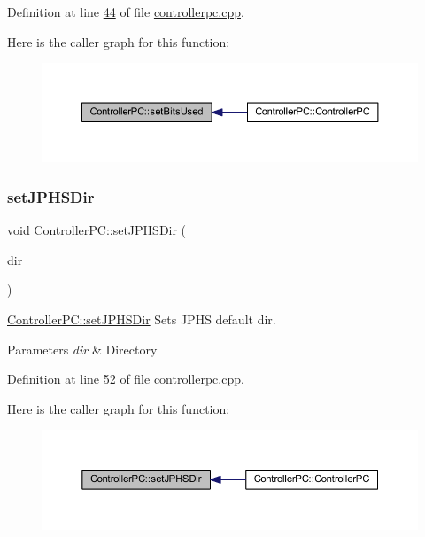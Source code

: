 Definition at line \mbox{\hyperlink{controllerpc_8cpp_source_l00044}{44}} of file \mbox{\hyperlink{controllerpc_8cpp_source}{controllerpc.\+cpp}}.

Here is the caller graph for this function\+:
\nopagebreak
\begin{figure}[H]
\begin{center}
\leavevmode
\includegraphics[width=350pt]{class_controller_p_c_afd8d33ed84e463c5e0ce6715067003f3_icgraph}
\end{center}
\end{figure}
\mbox{\label{class_controller_p_c_ac00d29685a7e5b780c01eb438e10f96d}} 
\subsubsection{\texorpdfstring{set\+J\+P\+H\+S\+Dir}{setJPHSDir}}
{\footnotesize\ttfamily void Controller\+P\+C\+::set\+J\+P\+H\+S\+Dir (\begin{DoxyParamCaption}\item[{Q\+String}]{dir }\end{DoxyParamCaption})\hspace{0.3cm}{\ttfamily [slot]}}



\mbox{\hyperlink{class_controller_p_c_ac00d29685a7e5b780c01eb438e10f96d}{Controller\+P\+C\+::set\+J\+P\+H\+S\+Dir}} Sets J\+P\+HS default dir. 


\begin{DoxyParams}{Parameters}
{\em dir} & Directory \\
\hline
\end{DoxyParams}


Definition at line \mbox{\hyperlink{controllerpc_8cpp_source_l00052}{52}} of file \mbox{\hyperlink{controllerpc_8cpp_source}{controllerpc.\+cpp}}.

Here is the caller graph for this function\+:
\nopagebreak
\begin{figure}[H]
\begin{center}
\leavevmode
\includegraphics[width=350pt]{class_controller_p_c_ac00d29685a7e5b780c01eb438e10f96d_icgraph}
\end{center}
\end{figure}


